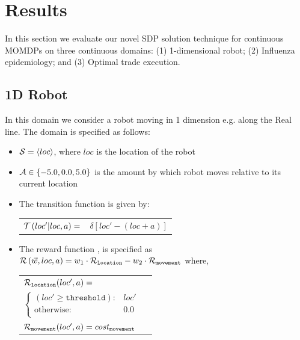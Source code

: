 \section{Results}
\label{sec:results}

In this section we evaluate our novel SDP solution technique for continuous MOMDPs on three continuous domains: (1) 1-dimensional robot; (2) Influenza epidemiology; and (3) Optimal trade execution.

\subsection{1D Robot}
\label{sec:results_robot}

In this domain we consider a robot moving in 1 dimension e.g. along the Real line. The domain is specified as follows:
\begin{itemize}
    \item {\footnotesize $ \mathcal{S} = \left\langle loc \right\rangle$}, where $ loc $ is the location of the robot
    \item {\footnotesize $ \mathcal{A} \in \left\lbrace -5.0, 0.0, 5.0 \right\rbrace $} is the amount by which robot moves relative to its current location
    \item The transition function {\footnotesize \Transition} is given by:    \\
    {\footnotesize 
        \abovedisplayskip=5pt
        \belowdisplayskip=0pt
        \renewcommand{\arraystretch}{1.5}
        \begin{tabular}{ll}
            $ \mathcal{T}\left( loc' | loc, a \right) =$ & $ \delta \left[ loc' - (loc + a) \right] $ \\
        \end{tabular}
    }%
    \item The reward function {\footnotesize \Reward}, is specified as {\footnotesize $ \mathcal{R}\left(\vec{w}, loc, a \right) = w_1 \cdot \mathcal{R}_{\mathtt{location}} - w_2 \cdot \mathcal{R}_{\mathtt{movement}} $} where, \\
    {\footnotesize 
        \abovedisplayskip=10pt
        \belowdisplayskip=0pt
        \renewcommand{\arraystretch}{1.5}
        \begin{tabular}{ll}    
            $ \mathcal{R}_{\mathtt{location}}(loc', a) = $ &  $ $ \\
                \qquad $ \begin{cases}
                (loc' \geq \mathtt{threshold}) : & loc' \\
                \text{otherwise} : & 0.0 \\
                \end{cases} $ & $ $\\
            $ \mathcal{R}_{\mathtt{movement}}(loc', a) = cost_{\mathtt{movement}} $ & $ $ \\                        
        \end{tabular}
    }    
\end{itemize} 

